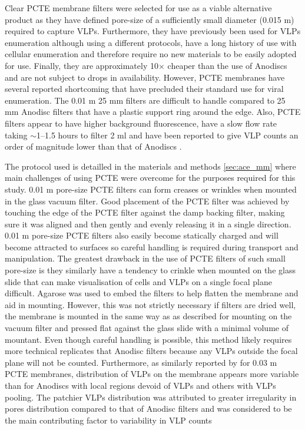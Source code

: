 Clear \ac{PCTE} membrane filters were selected for use as a viable alternative product as they have defined pore-size of a sufficiently small diameter (0.015 \textmu{}m) required to capture \acp{VLP}. 
Furthermore, they have previously been used for \acp{VLP} enumeration \cite{Hara1991, Proctor1992} although using a different protocols, have a long history of use with cellular enumeration \cite{Hobbie1977} and therefore require no new materials to be easily adopted for use.
Finally, they are approximately 10$\times$ cheaper than the use of Anodiscs and are not subject to drops in availability.
However, \ac{PCTE} membranes have several reported shortcoming that have precluded their standard use for viral enumeration.
The 0.01 \textmu{}m 25 mm  filters are difficult to handle compared to 25 mm Anodisc filters that have a plastic support ring around the edge.
Also, \ac{PCTE} filters appear to have higher background fluorescence, have a slow flow rate taking $\sim$1--1.5 hours to filter 2 ml \cite{Hara1991} and have been reported to give \ac{VLP} counts an order of magnitude lower than that of Anodiscs \cite{Budinoff2011}.%

The protocol used is detailled in the materials and methods \ref{sec:ace_mm} where main challenges of using \ac{PCTE} were overcome for the purposes required for this study.
0.01 \textmu{}m pore-size \ac{PCTE} filters can form creases or wrinkles when mounted in the glass vacuum filter.
Good placement of the \ac{PCTE} filter was achieved by touching the edge of the \ac{PCTE} filter against the damp backing filter, making sure it was aligned and then gently and evenly releasing it in a single direction. 
0.01 \textmu{}m pore-size \ac{PCTE} filters also easily become statically charged and will become attracted to surfaces so careful handling is required during transport and manipulation. 
The greatest drawback in the use of \ac{PCTE} filters of such small pore-size is they similarly have a tendency to crinkle when mounted on the glass slide that can make visualisation of cells and \acp{VLP} on a single focal plane difficult.
Agarose was used to embed the filters to help flatten the membrane and aid in mounting.
However, this was not strictly necessary if filters are dried well, the membrane is mounted in the same way as as described for mounting on the vacuum filter and pressed flat against the glass slide with a minimal volume of mountant.
Even though careful handling is possible, this method likely requires more technical replicates that Anodisc filters because any \acp{VLP} outside the focal plane will not be counted.
Furthermore, as similarly reported by \citet{Diemer2011} for 0.03 \textmu{}m \ac{PCTE} membranes, distribution of \acp{VLP} on the membrane appears more variable than for Anodiscs with local regions devoid of \acp{VLP} and others with \acp{VLP} pooling.
The patchier \acp{VLP} distribution was attributed to greater irregularity in pores distribution compared to that of Anodisc filters and was considered to be the main contributing factor to variability in \ac{VLP} counts \cite{Diemer2011}

